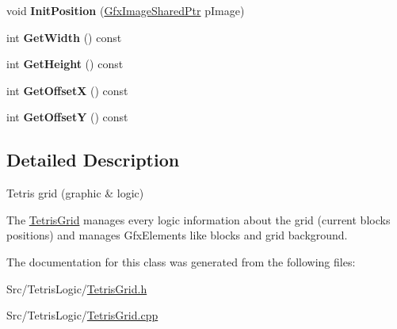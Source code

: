 \begin{DoxyCompactItemize}
\item 
\hypertarget{classTetrisGrid_a6b61c6f2d8aec1d46a962b6f87eb0dd6}{void {\bfseries Init\-Position} (\hyperlink{GfxImage_8h_a42b2baf6110731a1a358d365e303e086}{Gfx\-Image\-Shared\-Ptr} p\-Image)}\label{classTetrisGrid_a6b61c6f2d8aec1d46a962b6f87eb0dd6}

\item 
\hypertarget{classTetrisGrid_ae421a7401e743fad0ba7202af5a5e5ec}{int {\bfseries Get\-Width} () const }\label{classTetrisGrid_ae421a7401e743fad0ba7202af5a5e5ec}

\item 
\hypertarget{classTetrisGrid_a504f8c3a5ca30981811c3d010630d44f}{int {\bfseries Get\-Height} () const }\label{classTetrisGrid_a504f8c3a5ca30981811c3d010630d44f}

\item 
\hypertarget{classTetrisGrid_a34609e00cc1520f4510f732876ee99c7}{int {\bfseries Get\-Offset\-X} () const }\label{classTetrisGrid_a34609e00cc1520f4510f732876ee99c7}

\item 
\hypertarget{classTetrisGrid_a2f90c3098f0ae75645861fc66c91974c}{int {\bfseries Get\-Offset\-Y} () const }\label{classTetrisGrid_a2f90c3098f0ae75645861fc66c91974c}

\end{DoxyCompactItemize}


\subsection{Detailed Description}
Tetris grid (graphic \& logic) 

The \hyperlink{classTetrisGrid}{Tetris\-Grid} manages every logic information about the grid (current blocks positions) and manages Gfx\-Elements like blocks and grid background. 

The documentation for this class was generated from the following files\-:\begin{DoxyCompactItemize}
\item 
Src/\-Tetris\-Logic/\hyperlink{TetrisGrid_8h}{Tetris\-Grid.\-h}\item 
Src/\-Tetris\-Logic/\hyperlink{TetrisGrid_8cpp}{Tetris\-Grid.\-cpp}\end{DoxyCompactItemize}
